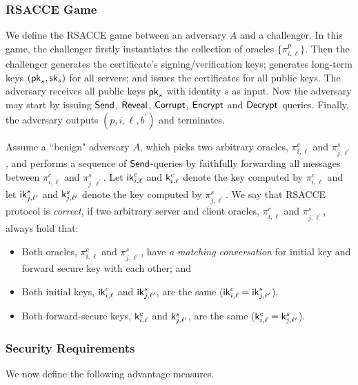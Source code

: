 \subsubsection{RSACCE Game}
We define the RSACCE game between an adversary $A$ and
a challenger.
In this game, the challenger firstly instantiates the
collection of oracles $\{\pi^p_{i,\ell}\}$.
Then the challenger generates the certificate's
signing/verification keys; generates long-term keys
$(\mathsf{pk}_s, \mathsf{sk}_s)$ for all servers; and issues the
certificates for all public keys.
The adversary receives all public keys $\mathsf{pk}_s$ with
identity $s$ as input.
Now the adversary may start by issuing $\mathsf{Send}$,
$\mathsf{Reveal}$, $\mathsf{Corrupt}$, $\mathsf{Encrypt}$ and $\mathsf{Decrypt}$ queries.
Finally, the adversary outputs
$(p, i, \ell, b^{\prime})$ and terminates.

\begin{definition}[Correctness]
 Assume a ``benign" adversary $A$, which picks two
 arbitrary oracles, $\pi^c_{i, \ell}$ and
 $\pi^s_{j, \ell^{\prime}}$, and performs a sequence of
 $\mathsf{Send}$-queries by faithfully forwarding all messages
 between $\pi^c_{i, \ell}$ and $\pi^s_{j, \ell^{\prime}}$.
 Let $\mathsf{ik}^c_{i, \ell}$ and $\mathsf{k}^c_{i, \ell}$ denote the
 key computed by $\pi^c_{i, \ell}$ and let
 $\mathsf{ik}^s_{j, \ell^{\prime}}$ and $\mathsf{k}^s_{j, \ell^{\prime}}$
 denote the key computed by $\pi^s_{j, \ell^{\prime}}$.
 We say that RSACCE protocol is \textit{correct}, if two
 arbitrary server and client oracles, $\pi^c_{i, \ell}$
 and $\pi^s_{j, \ell^{\prime}}$, always hold that:
 \begin{itemize}
  \item{Both oracles, $\pi^c_{i, \ell}$ and
  $\pi^s_{j, \ell^{\prime}}$, have
  \textit{a matching conversation} for initial key
  and forward secure key with each other; and}

  \item{Both initial keys, $\mathsf{ik}^c_{i, \ell}$ and
  $\mathsf{ik}^s_{j, \ell^{\prime}}$, are the same
  ($\mathsf{ik}^c_{i, \ell} = \mathsf{ik}^s_{j, \ell^{\prime}}$).}

  \item{Both forward-secure keys, $\mathsf{k}^c_{i, \ell}$ and
  $\mathsf{k}^s_{j, \ell^{\prime}}$, are the same
  ($\mathsf{k}^c_{i, \ell} = \mathsf{k}^s_{j, \ell^{\prime}}$).}
 \end{itemize}
\end{definition}

\subsubsection{Security Requirements}
We now define the following advantage measures.

